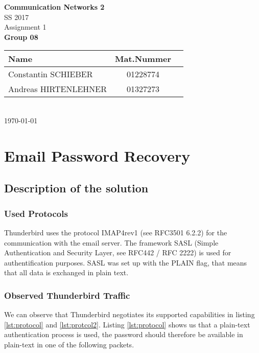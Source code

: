 \documentclass[parskip=full]{scrartcl}
\begin{document}
\begin{titlepage}
    \centering
    \vspace*{2cm}
    {\Huge \textbf{Communication Networks 2}}\\
    SS 2017\\
    \vspace*{1cm}
    {\Large Assignment 1}
    \\\vspace*{3cm}
    {\Large \textbf{Group 08}}\\
    \vspace*{1cm}
    {\large 
        \begin{tabular}{l c c}
            Name & Mat.Nummer \\ \hline
            Constantin SCHIEBER & 01228774 \\
            Andreas HIRTENLEHNER & 01327273
        \end{tabular}
    }
    \\\vspace*{7cm}
    \today
\end{titlepage}

\section{Email Password Recovery}

\subsection{Description of the solution}

\subsubsection{Used Protocols}
Thunderbird uses the protocol IMAP4rev1 (see RFC3501 6.2.2) for the communication with the email server.
The framework SASL (Simple Authentication and Security Layer, see RFC442 / RFC 2222) is used for authentification purposes.
SASL was set up with the PLAIN flag, that means that all data is exchanged in plain text.

\subsubsection{Observed Thunderbird Traffic}
We can observe that Thunderbird negotiates its supported capabilities in listing \ref{lst:protocol} and \ref{lst:protcol2}.
Listing \ref{lst:protocol} shows us that a plain-text authentication process is used, the password should therefore be available in plain-text in one of the following packets.
\end{document}
